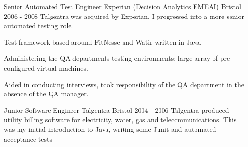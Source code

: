 \begin{cventries}
  \cventrypara
    {Senior Automated Test Engineer} %
    {Experian (Decision Analytics EMEAI)} %
    {Bristol} %
    {2006  - 2008} %
    {Talgentra was acquired by Experian, I progressed into a more senior automated testing role.}
    {
      \begin{cvitems} %
        \item {Test framework based around FitNesse and Watir written in Java. }
        \item {Administering the QA departments testing environments; large array of pre-configured virtual machines.}
        \item {Aided in conducting interviews, took responsibility of the QA department in the absence of the QA manager.}
      \end{cvitems}
    }

  \cventry
    {Junior Software Engineer } %
    {Talgentra} %
    {Bristol} %
    {2004 - 2006} %
    {Talgentra produced utility billing software for electricity, water, gas and telecommunications. This was my initial introduction to Java, writing some Junit and automated acceptance tests.
    }
\end{cventries}
